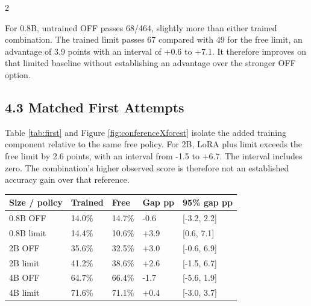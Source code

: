 \documentclass[11pt,letterpaper]{article}
\begin{document}
\begin{multicols}{2}

For 0.8B, untrained OFF passes 68/464, slightly more than either trained combination. The trained limit passes 67 compared with 49 for the free limit, an advantage of 3.9 points with an interval of +0.6 to +7.1. It therefore improves on that limited baseline without establishing an advantage over the stronger OFF option.\par

\subsection*{4.3 Matched First Attempts}

Table \ref{tab:first} and Figure \ref{fig:conferenceXforest} isolate the added training component relative to the same free policy. For 2B, LoRA plus limit exceeds the free limit by 2.6 points, with an interval from -1.5 to +6.7. The interval includes zero. The combination's higher observed score is therefore not an established accuracy gain over that reference.\par

\end{multicols}
\begin{center}\begin{minipage}{\textwidth}
\begingroup\singlespacing\small\setlength{\tabcolsep}{4pt}
\label{tab:first}
\begin{tabular}{|p{1.130in}|p{1.130in}|p{1.130in}|p{1.130in}|p{1.130in}|}
\hline
\textbf{Size / policy} & \textbf{Trained} & \textbf{Free} & \textbf{Gap pp} & \textbf{95\% gap pp}\\\hline
0.8B OFF & 14.0\% & 14.7\% & -0.6 & [-3.2, 2.2]\\\hline
0.8B limit & 14.4\% & 10.6\% & +3.9 & [0.6, 7.1]\\\hline
2B OFF & 35.6\% & 32.5\% & +3.0 & [-0.6, 6.9]\\\hline
2B limit & 41.2\% & 38.6\% & +2.6 & [-1.5, 6.7]\\\hline
4B OFF & 64.7\% & 66.4\% & -1.7 & [-5.6, 1.9]\\\hline
4B limit & 71.6\% & 71.1\% & +0.4 & [-3.0, 3.7]\\\hline
\end{tabular}
\endgroup
\end{minipage}\end{center}
\end{document}
